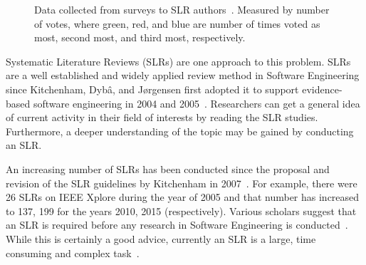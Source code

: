 \documentclass{svjour3}
\theoremstyle{break}
\begin{document}
\begin{figure}[t]
    \centering
    \caption{Data collected from surveys to SLR authors~\cite{carver2013identifying}. Measured by number of votes, where {\setlength{\fboxsep}{1pt}\colorbox{green!40}{green}}, {\setlength{\fboxsep}{1pt}\colorbox{red!30}{red}}, and {\setlength{\fboxsep}{1pt}\colorbox{blue!50}{blue}} are number of times voted as most, second most, and third most, respectively.}
    \label{fig:barrier}
\end{figure}
Systematic Literature Reviews
(SLRs) are one approach to this problem. SLRs are a well established and widely
applied review method in Software Engineering since Kitchenham, Dyb{\^{a}}, and
J{\o}rgensen first adopted it to support evidence-based software engineering in
2004 and 2005~\cite{kitchenham2004evidence,1377125}. 
Researchers can get a
general idea of current activity in their field of interests by reading the SLR
studies. Furthermore, a
deeper understanding of the topic may be gained by conducting an SLR.

An increasing number of SLRs has been conducted since the proposal and
revision of the SLR guidelines by Kitchenham in 2007~\cite{keele2007guidelines}. For
example, there were 26 SLRs on IEEE Xplore during the year of 2005 and that
number has increased to 137, 199 for the years 2010, 2015 (respectively). Various scholars  suggest that an SLR is required before any research in Software
Engineering is conducted~\cite{keele2007guidelines}.
While this is certainly a good advice,
currently an SLR is
a large, time consuming and complex
task~\cite{hassler2016identification,hassler2014outcomes,carver2013identifying,bowes2012slurp}.
\end{document}
